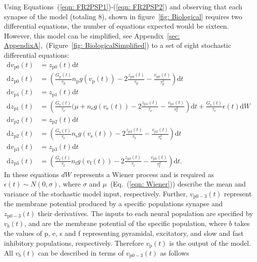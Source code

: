 Using Equations~(\ref{eqn: FR2PSP1})-(\ref{eqn: FR2PSP2}) and observing that each synapse of the model (totaling 8), shown in figure~\ref{fig: Biological} requires two differential equations, the number of equations expected would be sixteen. However, this model can be simplified, see Appendix~\ref{sec: AppendixA},~(Figure~\ref{fig: BiologicalSimplified}) to a set of eight stochastic differential equations: \begin{align}%
\mathrm{d}v_{\mathrm{p0}}(t)&= z_{\mathrm{p0}}(t)\mathrm{d}t\\
\mathrm{d}z_{\mathrm{p0}}(t)&=\left(\frac{G_{\mathrm{p}}(t)}{\tau_{\mathrm{p}}}n_{\mathrm{p}}g(v_{\mathrm{p}}(t))-2\frac{z_{\mathrm{p0}}(t)}{\tau_{\mathrm{p}}}-\frac{v_{\mathrm{p0}}(t)}{\tau_{\mathrm{p}}^{2}}\right)\mathrm{d}t\\
\mathrm{d}v_{\mathrm{p1}}(t)&= z_{\mathrm{p1}}(t)\mathrm{d}t\\
\label{eqn: Wiener}
\mathrm{d}z_{\mathrm{p1}}(t)&=\left(\frac{G_{\mathrm{e}}(t)}{\tau_{\mathrm{e}}}(\mu +n_{\mathrm{e}}g(v_{\mathrm{e}}(t))-2\frac{z_{\mathrm{p1}}(t)}{\tau_{\mathrm{e}}}-\frac{v_{\mathrm{p1}}(t)}{\tau_{\mathrm{e}}^{2}}\right)\mathrm{d}t + \frac{G_{\mathrm{e}}(t)}{\tau_{\mathrm{e}}}\epsilon(t)\mathrm{d}W\\
\mathrm{d}v_{\mathrm{p2}}(t)&= z_{\mathrm{p2}}(t)\mathrm{d}t\\
\mathrm{d}z_{\mathrm{p2}}(t)&=\left(\frac{G_{\mathrm{s}}(t)}{\tau_{\mathrm{s}}}n_{\mathrm{s}}g(v_{\mathrm{s}}(t))-2\frac{z_{\mathrm{p2}}(t)}{\tau_{\mathrm{s}}}-\frac{v_{\mathrm{p2}}(t)}{\tau_{\mathrm{s}}^{2}}\right)\mathrm{d}t\\
\mathrm{d}v_{\mathrm{p3}}(t)&= z_{\mathrm{p3}}(t)\mathrm{d}t\\
\mathrm{d}z_{\mathrm{p3}}(t)&=\left(\frac{G_{\mathrm{f}}(t)}{\tau_{\mathrm{f}}}n_{\mathrm{f}}g(v_{\mathrm{f}}(t))-2\frac{z_{\mathrm{p3}}(t)}{\tau_{\mathrm{f}}}-\frac{v_{\mathrm{p3}}(t)}{\tau_{\mathrm{f}}^{2}}\right)\mathrm{d}t.
\end{align} In these equations $dW$ represents a Wiener process \iref and is required as $\epsilon(t)\sim N(0,\sigma)$, where $\sigma$ and $\mu$~(Eq.~(\ref{eqn: Wiener})) describe the mean and variance of the stochastic model input, respectively. Further, $v_{\mathrm{p0-3}}(t)$ represent the membrane potential produced by a specific populations synapse and $z_{\mathrm{p0-3}}(t)$ their derivatives. The inputs to each neural population are specified by $v_{b}(t) $, and are the membrane potential of the specific population, where $b$ takes the values of p, e, s and f representing pyramidal, excitatory, and slow and fast inhibitory populations, respectively. Therefore $v_{\mathrm{p}}(t) $ is the output of the model. All $v_{b}(t) $ can be described in terms of $v_{\mathrm{p0-3}}(t)$ as follows \begin{align}%

\end{align}
